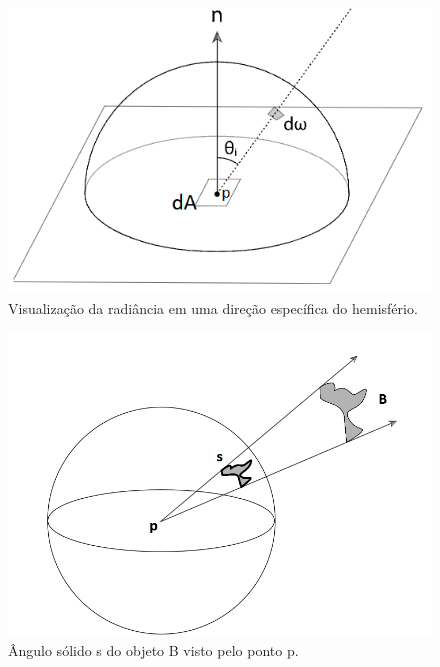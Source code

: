 \documentclass[english,
               brazil,
               bsc] %
               {dcomp-abntex2}
\begin{document}
\begin{figure}[h]
        \caption{\label{radiance-img} \small Visualização da radiância em uma direção específica do hemisfério. }
        \begin{center}
            \includegraphics[scale=0.5]{./Imagens/irradiance_hemisphere.png}
        \end{center}
\end{figure}


\begin{figure}[h]
  \caption{\label{solid-angle} \small   Ângulo sólido s do objeto B visto pelo ponto p. }
        \begin{center}
            \includegraphics[scale=0.5]{./Imagens/solid_angle.png}
        \end{center}
\end{figure}
\end{document}
